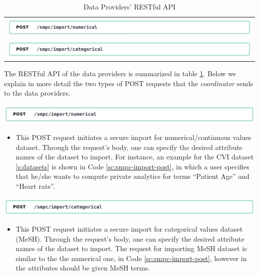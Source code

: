 \begin{table}[H]
  \centering
  \caption{Data Providers' RESTful API}
  \label{t:data-providers-api}
\begin{tabular}{l}
  \includegraphics[page=1,width=\textwidth]{figures/post4.pdf} \\
  \includegraphics[page=1,width=\textwidth]{figures/post5.pdf} \\
\end{tabular}
\end{table}


The RESTful API of the data providers is summarized in table \ref{t:data-providers-api}.
Below we explain in more detail the two types of POST requests that the \textit{coordinator} sends to the data providers.

\includegraphics[page=1,width=\textwidth]{figures/post4.pdf}
\begin{itemize}
\item[]
This POST request initiates a secure import for numerical/continuous values dataset.
Through the request's body, one can specify the desired attribute names of the dataset to import.
For instance, an example for the CVI dataset \ref{s:datasets} is shown in Code \ref{sc:smpc-import-post}, in which a user specifies that he/she wants to compute private analytics for terms ``Patient Age'' and ``Heart rate''.
\end{itemize}

\includegraphics[page=1,width=\textwidth]{figures/post5.pdf}
\begin{itemize}
\item[]
This POST request initiates a secure import for categorical values dataset (MeSH).
Through the request's body, one can specify the desired attribute names of the dataset to import.
The request for importing MeSH dataset is similar to the the numerical one, in Code \ref{sc:smpc-import-post}, however in the attributes should be given MeSH terms.

\end{itemize}

